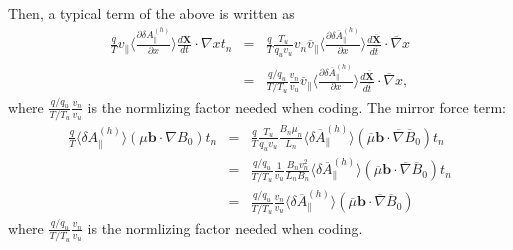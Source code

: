 \documentclass{article}
\begin{document}
Then, a typical term of the above is written as
\begin{eqnarray*}
  \frac{q}{T} v_{\parallel} \langle \frac{\partial \delta
  A_{\parallel}^{(h)}}{\partial x} \rangle \frac{d\mathbf{X}}{d t} \cdot
  \nabla x t_n & = & \frac{q}{T} \frac{T_u}{q_u v_u} v_n
  \overline{v}_{\parallel} \langle \frac{\partial \delta
  \overline{A}_{\parallel}^{(h)}}{\partial x} \rangle \frac{d
  \overline{\mathbf{X}}}{d \overline{t}} \cdot \overline{\nabla} x\\
  & = & \frac{q / q_u}{T / T_u} \frac{v_n}{v_u} \overline{v}_{\parallel}
  \langle \frac{\partial \delta \overline{A}_{\parallel}^{(h)}}{\partial x}
  \rangle \frac{d \overline{\mathbf{X}}}{d \overline{t}} \cdot
  \overline{\nabla} x,
\end{eqnarray*}
where $\frac{q / q_u}{T / T_u} \frac{v_n}{v_u}$ is the normlizing factor
needed when coding. The mirror force term:
\begin{eqnarray}
  \frac{q}{T} \langle \delta A_{\parallel}^{(h)} \rangle (\mu \mathbf{b} \cdot
  \nabla B_0) t_n & = & \frac{q}{T} \frac{T_u}{q_u v_u} \frac{B_n \mu_n}{L_n}
  \langle \delta \overline{A}_{\parallel}^{(h)} \rangle (\overline{\mu}
  \mathbf{b} \cdot \overline{\nabla} \overline{B}_0) t_n \\
  & = & \frac{q / q_u}{T / T_u} \frac{1}{v_u} \frac{B_n v_n^2}{L_n B_n}
  \langle \delta \overline{A}_{\parallel}^{(h)} \rangle (\overline{\mu}
  \mathbf{b} \cdot \overline{\nabla} \overline{B}_0) t_n \nonumber\\
  & = & \frac{q / q_u}{T / T_u} \frac{v_n}{v_u} \langle \delta
  \overline{A}_{\parallel}^{(h)} \rangle (\overline{\mu} \mathbf{b} \cdot
  \overline{\nabla} \overline{B}_0) \nonumber
\end{eqnarray}
where $\frac{q / q_u}{T / T_u} \frac{v_n}{v_u}$ is the normlizing factor
needed when coding.
\end{document}
